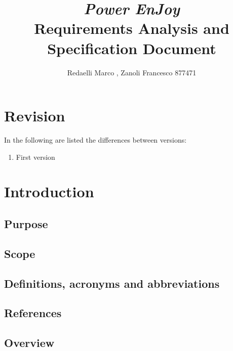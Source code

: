 \documentclass[]{report}
\title{{\Huge\textit{Power EnJoy}}\\{\LARGE Requirements Analysis and Specification Document}}
\author{Redaelli Marco , Zanoli Francesco 877471}
\begin{document}
\maketitle

\chapter*{Revision}
In the following are listed the differences between versions:
\begin{enumerate}
	\item First version
\end{enumerate}

\tableofcontents

\chapter{Introduction}

\section{Purpose}


\section{Scope}


\section{Definitions, acronyms and abbreviations}


\section{References}


\section{Overview}

\end{document}
